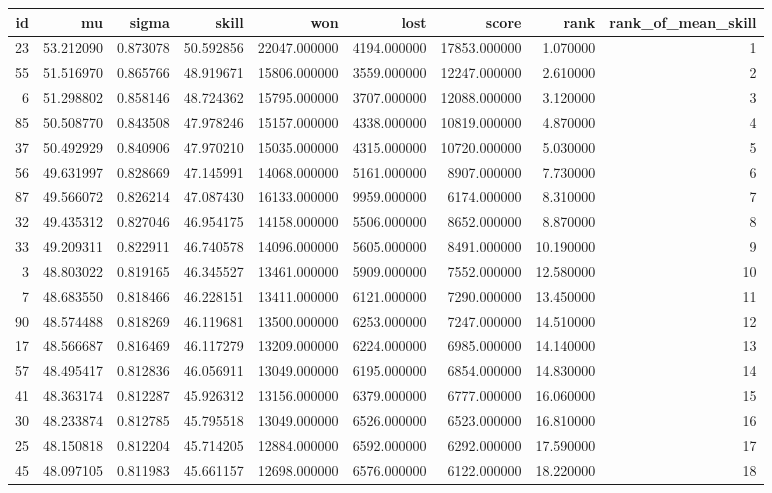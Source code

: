 \begin{tabular}{rrrrrrrrr}
\toprule
id & mu & sigma & skill & won & lost & score & rank & rank_of_mean_skill \\
\midrule
23 & 53.212090 & 0.873078 & 50.592856 & 22047.000000 & 4194.000000 & 17853.000000 & 1.070000 & 1 \\
55 & 51.516970 & 0.865766 & 48.919671 & 15806.000000 & 3559.000000 & 12247.000000 & 2.610000 & 2 \\
6 & 51.298802 & 0.858146 & 48.724362 & 15795.000000 & 3707.000000 & 12088.000000 & 3.120000 & 3 \\
85 & 50.508770 & 0.843508 & 47.978246 & 15157.000000 & 4338.000000 & 10819.000000 & 4.870000 & 4 \\
37 & 50.492929 & 0.840906 & 47.970210 & 15035.000000 & 4315.000000 & 10720.000000 & 5.030000 & 5 \\
56 & 49.631997 & 0.828669 & 47.145991 & 14068.000000 & 5161.000000 & 8907.000000 & 7.730000 & 6 \\
87 & 49.566072 & 0.826214 & 47.087430 & 16133.000000 & 9959.000000 & 6174.000000 & 8.310000 & 7 \\
32 & 49.435312 & 0.827046 & 46.954175 & 14158.000000 & 5506.000000 & 8652.000000 & 8.870000 & 8 \\
33 & 49.209311 & 0.822911 & 46.740578 & 14096.000000 & 5605.000000 & 8491.000000 & 10.190000 & 9 \\
3 & 48.803022 & 0.819165 & 46.345527 & 13461.000000 & 5909.000000 & 7552.000000 & 12.580000 & 10 \\
7 & 48.683550 & 0.818466 & 46.228151 & 13411.000000 & 6121.000000 & 7290.000000 & 13.450000 & 11 \\
90 & 48.574488 & 0.818269 & 46.119681 & 13500.000000 & 6253.000000 & 7247.000000 & 14.510000 & 12 \\
17 & 48.566687 & 0.816469 & 46.117279 & 13209.000000 & 6224.000000 & 6985.000000 & 14.140000 & 13 \\
57 & 48.495417 & 0.812836 & 46.056911 & 13049.000000 & 6195.000000 & 6854.000000 & 14.830000 & 14 \\
41 & 48.363174 & 0.812287 & 45.926312 & 13156.000000 & 6379.000000 & 6777.000000 & 16.060000 & 15 \\
30 & 48.233874 & 0.812785 & 45.795518 & 13049.000000 & 6526.000000 & 6523.000000 & 16.810000 & 16 \\
25 & 48.150818 & 0.812204 & 45.714205 & 12884.000000 & 6592.000000 & 6292.000000 & 17.590000 & 17 \\
45 & 48.097105 & 0.811983 & 45.661157 & 12698.000000 & 6576.000000 & 6122.000000 & 18.220000 & 18 \\

\end{tabular}
